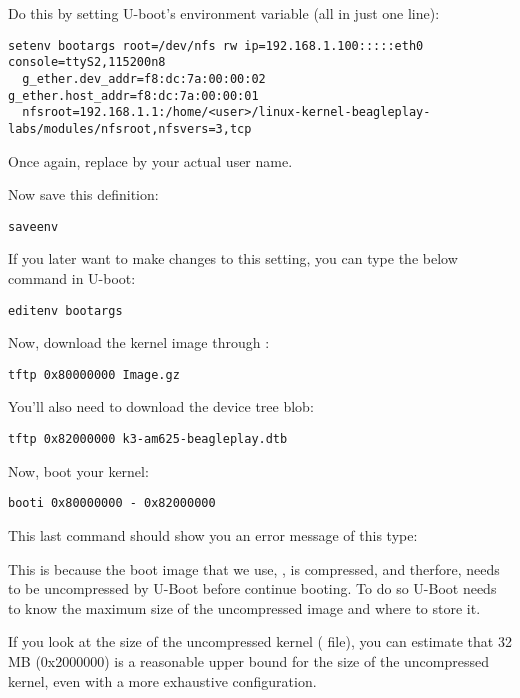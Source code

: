 Do this by setting U-boot's  environment variable (all in
just one line):

\begin{verbatim}
setenv bootargs root=/dev/nfs rw ip=192.168.1.100:::::eth0 console=ttyS2,115200n8
  g_ether.dev_addr=f8:dc:7a:00:00:02 g_ether.host_addr=f8:dc:7a:00:00:01
  nfsroot=192.168.1.1:/home/<user>/linux-kernel-beagleplay-labs/modules/nfsroot,nfsvers=3,tcp
\end{verbatim}

Once again, replace  by your actual user name.

Now save this definition:
\begin{verbatim}
saveenv
\end{verbatim}

If you later want to make changes to this setting, you can type the
below command in U-boot:

\begin{verbatim}
editenv bootargs
\end{verbatim}

Now, download the kernel image through :

\begin{verbatim}
tftp 0x80000000 Image.gz
\end{verbatim}

You'll also need to download the device tree blob:

\begin{verbatim}
tftp 0x82000000 k3-am625-beagleplay.dtb
\end{verbatim}

Now, boot your kernel:

\begin{verbatim}
booti 0x80000000 - 0x82000000
\end{verbatim}

This last command should show you an error message of this type:

This is because the boot image that we use, , is compressed, and
therfore, needs to be uncompressed by U-Boot before continue booting. To do so
U-Boot needs to know the maximum size of the uncompressed image and where to
store it.

If you look at the size of the uncompressed kernel ( file),
you can estimate that 32 MB (0x2000000) is a reasonable upper bound
for the size of the uncompressed kernel, even with a more exhaustive
configuration.

